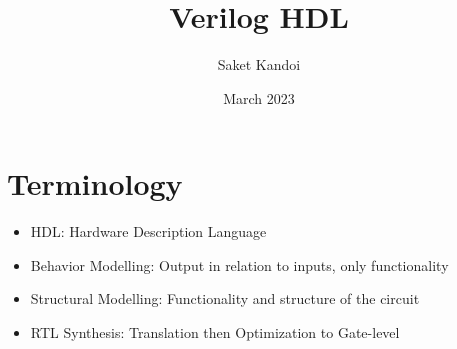 \documentclass{article}
\title{Verilog HDL}
\author{Saket Kandoi}
\date{March 2023}
\begin{document}
\maketitle

\section{Terminology}
\begin{itemize}
    \item HDL: Hardware Description Language 
    \item Behavior Modelling: Output in relation to inputs, only functionality
    \item Structural Modelling: Functionality and structure of the circuit
    \item RTL Synthesis: Translation then Optimization to Gate-level
\end{itemize}
\end{document}
